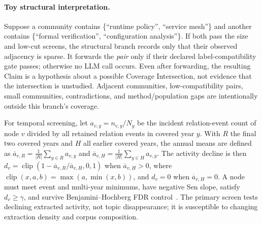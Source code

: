 \documentclass[runningheads]{llncs}
\begin{document}
\paragraph{Toy structural interpretation.} Suppose a community contains \{``runtime policy'', ``service mesh''\} and another contains \{``formal verification'', ``configuration analysis''\}. If both pass the size and low-cut screens, the structural branch records only that their observed adjacency is sparse. It forwards the \emph{pair} only if their declared label-compatibility gate passes; otherwise no LLM call occurs. Even after forwarding, the resulting Claim is a hypothesis about a possible Coverage Intersection, not evidence that the intersection is unstudied. Adjacent communities, low-compatibility pairs, small communities, contradictions, and method/population gaps are intentionally outside this branch's coverage.

For temporal screening, let $a_{v,y}=n_{v,y}/N_y$ be the incident relation-event count of node $v$ divided by all retained relation events in covered year $y$. With $R$ the final two covered years and $H$ all earlier covered years, the annual means are defined as $\overline{a}_{v,R} = \frac{1}{|R|} \sum_{y \in R} a_{v,y}$ and $\overline{a}_{v,H} = \frac{1}{|H|} \sum_{y \in H} a_{v,y}$. The activity decline is then $d_v=\operatorname{clip}(1-\overline{a}_{v,R}/\overline{a}_{v,H},0,1)$ when $\overline{a}_{v,H}>0$, where $\operatorname{clip}(x, a, b) = \max(a, \min(x, b))$, and $d_v=0$ when $\overline{a}_{v,H}=0$. A node must meet event and multi-year minimums, have negative Sen slope, satisfy $d_v\geq\gamma$, and survive Benjamini--Hochberg FDR control~\cite{mann1945trend,kendall1975rank,sen1968slope,benjamini1995fdr}. The primary screen tests declining extracted activity, not topic disappearance; it is susceptible to changing extraction density and corpus composition.
\end{document}
